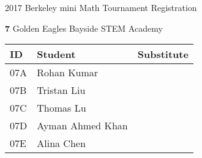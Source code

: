\documentclass[12pt]{amsart}
\begin{document}
\newpage



\renewcommand{\TeamID}{7}
\renewcommand{\TeamName}{Golden Eagles}
\renewcommand{\SchoolName}{Bayside STEM Academy}
\renewcommand{\IDA}{07A}
\renewcommand{\IDB}{07B}
\renewcommand{\IDC}{07C}
\renewcommand{\IDD}{07D}
\renewcommand{\IDE}{07E}
\renewcommand{\StudentA}{Rohan Kumar}
\renewcommand{\StudentB}{Tristan Liu}
\renewcommand{\StudentC}{Thomas Lu}
\renewcommand{\StudentD}{Ayman Ahmed Khan}
\renewcommand{\StudentE}{Alina Chen}

\begin{center}
{\sc \Large 2017 Berkeley mini Math Tournament Registration}

\bigskip
\bigskip

{\bf \Large  \TeamID} \hfill {\large \TeamName} \hfill {\large \SchoolName}

\bigskip
\bigskip

\begin{tabular}{| p{} | p{} | p{} |}
\hline
\bf ID         & \bf Student             & \bf Substitute             \\ \hline
\IDA           & \StudentA               &                            \\ \hline
\IDB           & \StudentB               &                            \\ \hline
\IDC           & \StudentC               &                            \\ \hline
\IDD           & \StudentD               &                            \\ \hline
\IDE           & \StudentE               &                            \\ \hline
\end{tabular} 
\end{center}
\bigskip
\bigskip

\newpage



\renewcommand{\TeamID}{8}
\renewcommand{\TeamName}{Imperial Eagles}
\renewcommand{\SchoolName}{Bayside STEM Academy}
\renewcommand{\IDA}{08A}
\renewcommand{\IDB}{08B}
\renewcommand{\IDC}{08C}
\renewcommand{\IDD}{08D}
\renewcommand{\IDE}{08E}
\renewcommand{\StudentA}{Amogh Parvate}
\renewcommand{\StudentB}{Brian Zhong}
\renewcommand{\StudentC}{Sean Xiong}
\renewcommand{\StudentD}{Arcadia Dong}
\renewcommand{\StudentE}{Kevin Yue}
\end{document}
